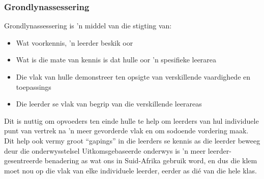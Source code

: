 \subsubsection{Grondlynassessering}
Grondlynassessering is 'n middel van die stigting van:

\begin{itemize}[noitemsep]
\item
  Wat voorkennis, 'n leerder beskik oor
\item
  Wat is die mate van kennis is dat hulle oor 'n spesifieke leerarea
\item
  Die vlak van hulle demonstreer ten opsigte van verskillende vaardighede en toepassings
\item
  Die leerder se vlak van begrip van die verskillende leerareas
\end{itemize}
Dit is nuttig om opvoeders ten einde hulle te help om leerders van hul individuele punt van vertrek na 'n meer gevorderde vlak en om sodoende vordering maak. Dit help ook vermy groot ``gapings'' in die leerders se kennis as die leerder beweeg deur die onderwysstelsel Uitkomsgebaseerde onderwys is 'n meer leerder-gesentreerde benadering as wat ons in Suid-Afrika gebruik word, en dus die klem moet nou op die vlak van elke individuele leerder, eerder as dié van die hele klas.

